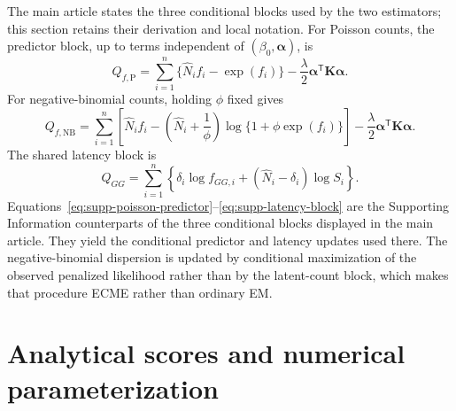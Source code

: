 \documentclass[11pt]{article}
\begin{document}
The main article states the three conditional blocks used by the two estimators; this section retains their derivation and local notation. For Poisson counts, the predictor block, up to terms independent of $(\beta_0,\bm{\alpha})$, is
\begin{equation}
Q_{f,\mathrm{P}}
=\sum_{i=1}^{n}\{\widehat N_i f_i-\exp(f_i)\}
-\frac{\lambda}{2}\bm{\alpha}^{\mathsf T}\bm{K}\bm{\alpha}.
\label{eq:supp-poisson-predictor}
\end{equation}
For negative-binomial counts, holding $\phi$ fixed gives
\begin{equation}
Q_{f,\mathrm{NB}}
=\sum_{i=1}^{n}\left[
\widehat N_i f_i-
\left(\widehat N_i+\frac{1}{\phi}\right)
\log\{1+\phi\exp(f_i)\}\right]
-\frac{\lambda}{2}\bm{\alpha}^{\mathsf T}\bm{K}\bm{\alpha}.
\label{eq:supp-nb-predictor}
\end{equation}
The shared latency block is
\begin{equation}
Q_{GG}=\sum_{i=1}^{n}
\left\{\delta_i\log f_{GG,i}
+(\widehat N_i-\delta_i)\log S_i\right\}.
\label{eq:supp-latency-block}
\end{equation}
Equations~\eqref{eq:supp-poisson-predictor}--\eqref{eq:supp-latency-block} are the Supporting Information counterparts of the three conditional blocks displayed in the main article. They yield the conditional predictor and latency updates used there. The negative-binomial dispersion is updated by conditional maximization of the observed penalized likelihood rather than by the latent-count block, which makes that procedure ECME rather than ordinary EM.

\section{Analytical scores and numerical parameterization}\label{sec:supp-scores}
\end{document}
